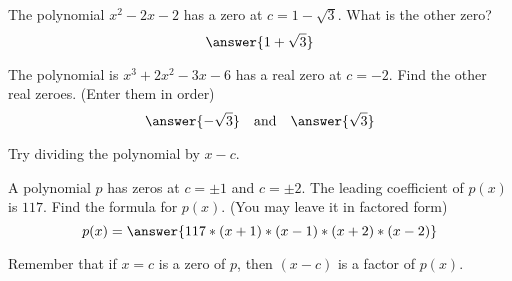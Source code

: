 \documentclass{ximera}
\author{Carl Stitz \and Jeff Zeager \and  Bobby Ramsey}
\begin{document}
\begin{exercise}
	The polynomial $x^2 - 2x - 2$ has a zero at $\displaystyle c = 1-\sqrt{3}$.  What is the other zero?
	\[ \answer{1+\sqrt{3}} \]
\end{exercise}

\begin{exercise}
	The polynomial is $\displaystyle x^3	+ 2x^2-3x-6$ has a real zero at $c = -2$.  Find the other real zeroes. (Enter them in order)
	\[ \answer{-\sqrt{3}}  \quad \text{and} \quad \answer{\sqrt{3}} \]
	\begin{feedback}
		Try dividing the polynomial by $x-c$.  
	\end{feedback}
\end{exercise}

\begin{exercise}
	A polynomial $p$ has zeros at $c=\pm 1$ and $c = \pm 2$.  The leading coefficient of $p(x)$ is $117$.  Find the formula for $p(x)$. (You may leave it in factored form)
	\[ p(x) = \answer{117*(x+1)*(x-1)*(x+2)*(x-2)} \]
	\begin{feedback}
		Remember that if $x=c$ is a zero of $p$, then $(x-c)$ is a factor of $p(x)$.
	\end{feedback}
\end{exercise}
\end{document}
